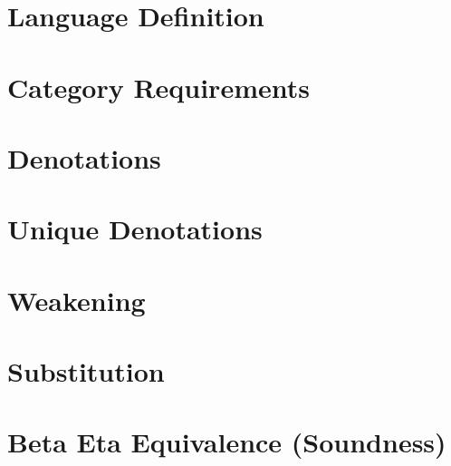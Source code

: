 \documentclass{report}
\begin{document}
\tableofcontents
\chapter{Language Definition}
\LanguageDefinition

\chapter{Category Requirements}
\CategoryRequirements

\chapter{Denotations}
\Denotations

\chapter{Unique Denotations}
\UniqueDenotations

\chapter{Weakening}
\Weakening

\chapter{Substitution}
\Substitution

\chapter{Beta Eta Equivalence (Soundness)}
\BetaEtaEquivalence
\end{document}
